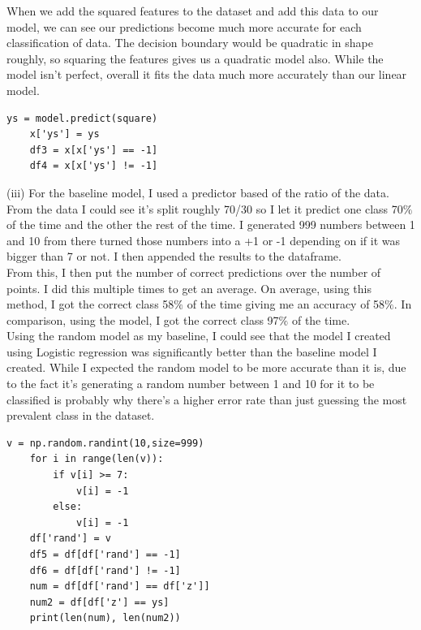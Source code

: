 \documentclass[10pt,a4paper]{article}
\begin{document}
When we add the squared features to the dataset and add this data to our model, we can see our predictions become much more accurate for each classification of data. The decision boundary would be quadratic in shape roughly, so squaring the features gives us a quadratic model also. While the model isn't perfect, overall it fits the data much more accurately than our linear model. 
\begin{verbatim}
ys = model.predict(square)
    x['ys'] = ys
    df3 = x[x['ys'] == -1]
    df4 = x[x['ys'] != -1]
\end{verbatim}
(iii)
For the baseline model, I used a predictor based of the ratio of the data. From the data I could see it's split roughly 70/30 so I let it predict one class 70\(\%\) of the time and the other the rest of the time. I generated 999 numbers between 1 and 10 from there turned those numbers into a +1 or -1 depending on if it was bigger than 7 or not. I then appended the results to the dataframe.
\\
From this, I then put the number of correct predictions over the number of points. I did this multiple times to get an average. On average, using this method, I got the correct class 58\(\%\) of the time giving me an accuracy of 58\(\%\). In comparison, using the model, I got the correct class 97\(\%\) of the time.
\\
Using the random model as my baseline, I could see that the model I created using Logistic regression was significantly better than the baseline model I created. While I expected the random model to be more accurate than it is, due to the fact it's generating a random number between 1 and 10 for it to be classified is probably why there's a higher error rate than just guessing the most prevalent class in the dataset.
\begin{verbatim}
v = np.random.randint(10,size=999)
    for i in range(len(v)):
        if v[i] >= 7:
            v[i] = -1
        else:
            v[i] = -1
    df['rand'] = v
    df5 = df[df['rand'] == -1]
    df6 = df[df['rand'] != -1]
    num = df[df['rand'] == df['z']]
    num2 = df[df['z'] == ys]
    print(len(num), len(num2))
\end{verbatim}
\end{document}
